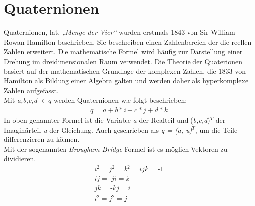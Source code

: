 \section{Quaternionen}
\label{chap:Quaternionen} %
Quaternionen, lat. \textit{„Menge der Vier“} wurden erstmals 1843 von Sir William Rowan Hamilton beschrieben. Sie beschreiben einen 
Zahlenbereich der die reellen Zahlen erweitert. Die mathematische Formel wird häufig zur Darstellung einer Drehung im dreidimensionalen Raum 
verwendet. Die Theorie der Quaterionen basiert auf der mathematischen Grundlage der komplexen Zahlen, die 1833 von Hamilton als Bildung 
einer Algebra galten und werden daher als hyperkomplexe Zahlen aufgefasst.
\\ 
\linebreak
Mit \textit{a,b,c,d $\in q$} werden Quaternionen wie folgt beschrieben:
\begin{align*}
    \textit{q} = \textit{a} + \textit{b} * \textit{i} + \textit{c} * \textit{j} + \textit{d} * \textit{k}
\end{align*}
In oben genannter Formel ist die Variable \textit{a} der Realteil und (\textit{b,c,d})$^T$ der Imaginärteil \textit{u} der Gleichung. 
Auch geschrieben als \textit{q = (a, u)$^T$}, um die Teile differenzieren zu können. 
\\ 
Mit der sogenannten \textit{Brougham Bridge}-Formel ist es möglich Vektoren zu dividieren. 
\begin{align*}
    \textit{i$^2$} = \textit{j$^2$} = \textit{k$^2$} = \textit{ijk} = \textit{-1} 
    \\
    \textit{ij} = \textit{-ji} = \textit{k} 
    \\
    \textit{jk} = \textit{-kj} = \textit{i} 
    \\ 
    \textit{i$^2$} = \textit{j$^2$} = \textit{j}
\end{align*}
